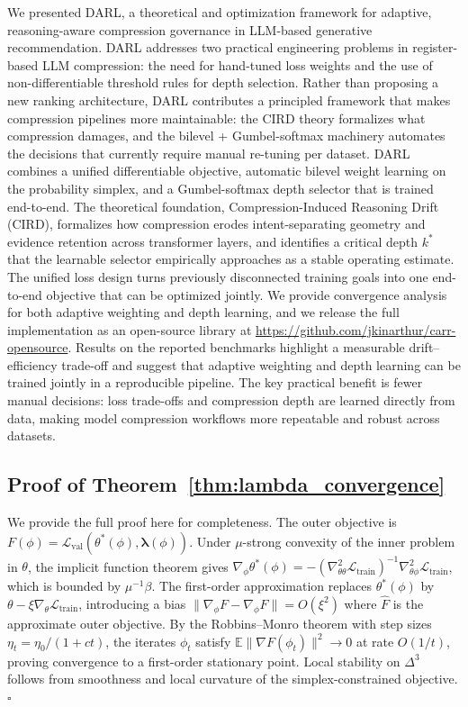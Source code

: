 \documentclass[lettersize,journal]{IEEEtran}
\newcommand{\E}{\mathbb{E}}
\newcommand{\calL}{\mathcal{L}}
\newcommand{\lambdavec}{\boldsymbol{\lambda}}
\begin{document}
We presented DARL, a theoretical and optimization framework for
adaptive, reasoning-aware compression governance in LLM-based
generative recommendation.
DARL addresses two practical engineering problems in register-based
LLM compression: the need for hand-tuned loss weights and the use of
non-differentiable threshold rules for depth selection.
Rather than proposing a new ranking architecture, DARL contributes
a principled framework that makes compression pipelines more
maintainable: the CIRD theory formalizes what compression damages,
and the bilevel + Gumbel-softmax machinery automates the decisions
that currently require manual re-tuning per dataset.
DARL combines a unified differentiable objective,
automatic bilevel weight learning on the probability simplex, and a
Gumbel-softmax depth selector that is trained end-to-end.
The theoretical foundation, Compression-Induced Reasoning Drift (CIRD),
formalizes how compression erodes intent-separating geometry
and evidence retention across transformer layers, and
identifies a critical depth $k^*$ that the learnable selector
empirically approaches as a stable operating estimate.
The unified loss design turns previously disconnected training
goals into one end-to-end objective that can be optimized jointly.
We provide convergence analysis for both adaptive weighting and
depth learning, and we release the full implementation as an
open-source library at
\url{https://github.com/jkinarthur/carr-opensource}.
Results on the reported benchmarks highlight a measurable
drift--efficiency trade-off and suggest that adaptive weighting and
depth learning can be trained jointly in a reproducible pipeline.
The key practical benefit is fewer manual decisions:
loss trade-offs and compression depth are learned directly from
data, making model compression workflows more repeatable and
robust across datasets.


\appendix
\subsection{Proof of Theorem~\ref{thm:lambda_convergence}}
\label{app:proof_lambda}

We provide the full proof here for completeness.
The outer objective is
$F(\phi) = \calL_{\text{val}}(\theta^*(\phi), \lambdavec(\phi))$.
Under $\mu$-strong convexity of the inner problem in $\theta$,
the implicit function theorem gives
$\nabla_\phi \theta^*(\phi) = -(\nabla^2_{\theta\theta} \calL_{\text{train}})^{-1}
\nabla^2_{\theta\phi} \calL_{\text{train}}$,
which is bounded by $\mu^{-1}\beta$.
The first-order approximation replaces $\theta^*(\phi)$ by
$\theta - \xi \nabla_\theta \calL_{\text{train}}$, introducing a
bias $\|\nabla_\phi F - \nabla_\phi \hat{F}\| = O(\xi^2)$
where $\hat{F}$ is the approximate outer objective.
By the Robbins--Monro theorem with step sizes
$\eta_t = \eta_0 / (1 + ct)$, the iterates
$\phi_t$ satisfy
$\E\|\nabla F(\phi_t)\|^2 \to 0$ at rate $O(1/t)$,
proving convergence to a first-order stationary point.
Local stability on $\Delta^3$ follows from smoothness and local
curvature of the simplex-constrained objective. $\square$
\end{document}
